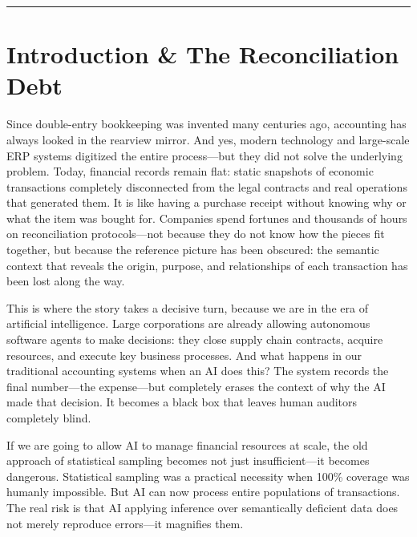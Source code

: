 \documentclass[12pt, a4paper]{article}
\begin{document}
\hrule
\vspace{1em}

\section{Introduction \& The Reconciliation Debt}

Since double-entry bookkeeping was invented many centuries ago, accounting has always looked in the rearview mirror. And yes, modern technology and large-scale ERP systems digitized the entire process---but they did not solve the underlying problem. Today, financial records remain flat: static snapshots of economic transactions completely disconnected from the legal contracts and real operations that generated them. It is like having a purchase receipt without knowing why or what the item was bought for. Companies spend fortunes and thousands of hours on reconciliation protocols---not because they do not know how the pieces fit together, but because the reference picture has been obscured: the semantic context that reveals the origin, purpose, and relationships of each transaction has been lost along the way.

This is where the story takes a decisive turn, because we are in the era of artificial intelligence. Large corporations are already allowing autonomous software agents to make decisions: they close supply chain contracts, acquire resources, and execute key business processes. And what happens in our traditional accounting systems when an AI does this? The system records the final number---the expense---but completely erases the context of why the AI made that decision. It becomes a black box that leaves human auditors completely blind.

If we are going to allow AI to manage financial resources at scale, the old approach of statistical sampling becomes not just insufficient---it becomes dangerous. Statistical sampling was a practical necessity when 100\% coverage was humanly impossible. But AI can now process entire populations of transactions. The real risk is that AI applying inference over semantically deficient data does not merely reproduce errors---it magnifies them.
\end{document}
